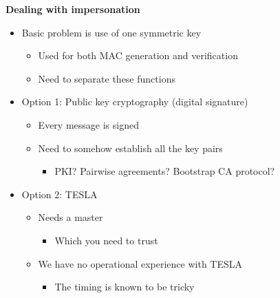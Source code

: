 \documentclass[helvetica]{seminar}
\newcommand{\heading}[1]{%
  \begin{center} 
    \large\bf 
    #1 
  \end{center} 
  \vspace{.4 in}}
\begin{document}
\begin{slide}
\heading{Dealing with impersonation}

\vspace{-.25 in}

\begin{itemize}
\item Basic problem is use of one symmetric key
\begin{itemize}
\item Used for both MAC generation and verification
\item Need to separate these functions
\end{itemize}
\item Option 1: Public key cryptography (digital signature)
\begin{itemize}
\item Every message is signed
\item Need to somehow establish all the key pairs
\begin{itemize}
\item PKI? Pairwise agreements? Bootstrap CA protocol?
\end{itemize}
\end{itemize}
\item Option 2: TESLA
\begin{itemize}
\item Needs a master
\begin{itemize}
\item Which you need to trust
\end{itemize}
\item We have no operational experience with TESLA
\begin{itemize}
\item The timing is known to be tricky
\end{itemize}
\end{itemize}
\end{itemize}
\end{slide}
\end{document}

